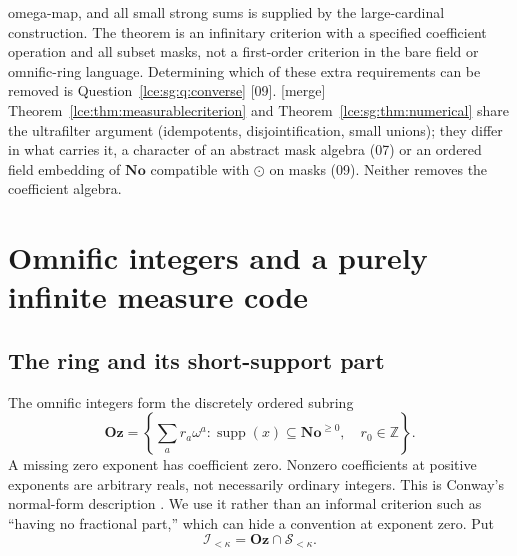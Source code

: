 \documentclass[11pt,letterpaper]{article}
\numberwithin{equation}{section}
\theoremstyle{definition}
\theoremstyle{remark}
\newcommand{\No}{\mathbf{No}}
\newcommand{\Oz}{\mathbf{Oz}}
\newcommand{\Z}{\mathbb Z}
\newcommand{\supp}{\operatorname{supp}}
\newcommand{\Sk}{\mathscr S_{<\kappa}}
\newcommand{\Ik}{\mathscr I_{<\kappa}}
\newcommand{\thref}[1]{Theorem~\ref{#1}}
\newcommand{\src}[1]{\textup{\textsf{\small[#1]}}}%
\newcommand{\mergetag}{\textup{\textsf{\small[merge]}}}%
\begin{document}
omega-map, and all small strong sums is supplied by the large-cardinal
construction. The theorem is an infinitary criterion with a specified
coefficient operation and all subset masks, not a first-order criterion in
the bare field or omnific-ring language. Determining which of these extra
requirements can be removed is Question~\ref{lce:sg:q:converse} \src{09}.
\mergetag{} \thref{lce:thm:measurablecriterion} and
\thref{lce:sg:thm:numerical} share the ultrafilter argument (idempotents,
disjointification, small unions); they differ in what carries it, a
character of an abstract mask algebra (07) or an ordered field embedding of
$\No$ compatible with $\odot$ on masks (09). Neither removes the coefficient
algebra.

\section{Omnific integers and a purely infinite measure code}\label{lce:sec:omnific}

\subsection{The ring and its short-support part}
The omnific integers form the discretely ordered subring
\begin{equation}\label{lce:eq:Oz}
 \Oz=\left\{\sum_a r_a\omega^a:
      \supp(x)\subseteq\No^{\ge0},\quad r_0\in\Z\right\}.
\end{equation}
A missing zero exponent has coefficient zero. Nonzero coefficients at
positive exponents are arbitrary reals, not necessarily ordinary integers.
This is Conway's normal-form description \cite{Conway,Gonshor}.
We use it rather than an informal criterion such as ``having no fractional
part,'' which can hide a convention at exponent zero.
Put
\[
 \Ik=\Oz\cap\Sk.
\]
\end{document}
